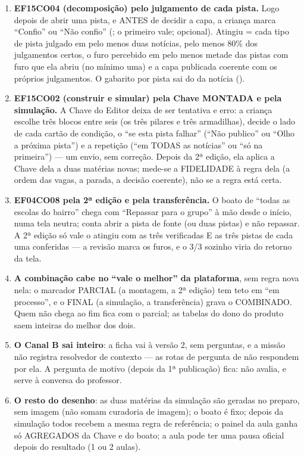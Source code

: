 \begin{enumerate}
  \item \textbf{EF15CO04 (decomposição) pelo julgamento de cada pista.} Logo
    depois de abrir uma pista, e ANTES de decidir a capa, a criança marca
    \enquote{Confio} ou \enquote{Não confio} (; o primeiro
    vale; opcional). Atingiu = cada tipo de pista julgado em pelo menos duas
    notícias, pelo menos 80\% dos julgamentos certos, o furo percebido em pelo
    menos metade das pistas com furo que ela abriu (no mínimo uma) e a capa
    publicada coerente com os próprios julgamentos. O gabarito por pista sai do
    da notícia ().
  \item \textbf{EF15CO02 (construir e simular) pela Chave MONTADA e pela
    simulação.} A Chave do Editor deixa de ser tentativa e erro: a criança
    escolhe três blocos entre seis (os três pilares e três armadilhas), decide o
    lado de cada cartão de condição, o \enquote{se esta pista falhar} (\enquote{Não
    publico} ou \enquote{Olho a próxima pista}) e a repetição (\enquote{em TODAS
    as notícias} ou \enquote{só na primeira}) --- um envio, sem correção. Depois
    da 2ª edição, ela aplica a Chave dela a duas matérias novas; mede-se a
    FIDELIDADE à regra dela (a ordem das vagas, a parada, a decisão coerente),
    não se a regra está certa.
  \item \textbf{EF04CO08 pela 2ª edição e pela transferência.} O boato de
    \enquote{todas as escolas do bairro} chega com \enquote{Repassar para o
    grupo} à mão desde o início, numa tela neutra; conta abrir a pista de
    fonte (ou duas pistas) e não repassar. A 2ª edição só vale o atingiu com as
    três verificadas E as três pistas de cada uma conferidas --- a revisão marca
    os furos, e o 3/3 sozinho viria do retorno da tela.
  \item \textbf{A combinação cabe no \enquote{vale o melhor} da plataforma}, sem
    regra nova nela: o marcador PARCIAL (a montagem, a 2ª edição) tem teto em
    \enquote{em processo}, e o FINAL (a simulação, a transferência) grava o
    COMBINADO. Quem não chega ao fim fica com o parcial; as tabelas do dono do
    produto saem inteiras do melhor dos dois.
  \item \textbf{O Canal B sai inteiro}: a ficha vai à versão 2, sem perguntas, e a
    missão não registra resolvedor de contexto --- as rotas de pergunta de
     não respondem por ela. A pergunta de motivo (depois da 1ª
    publicação) fica: não avalia, e serve à conversa do professor.
  \item \textbf{O resto do desenho}: as duas matérias da simulação são geradas
    no preparo, sem imagem (não somam curadoria de imagem); o boato é fixo;
    depois da simulação todos recebem a mesma regra de referência; o painel da
    aula ganha só AGREGADOS da Chave e do boato; a aula pode ter uma pausa
    oficial depois do resultado (1 ou 2 aulas).
\end{enumerate}

